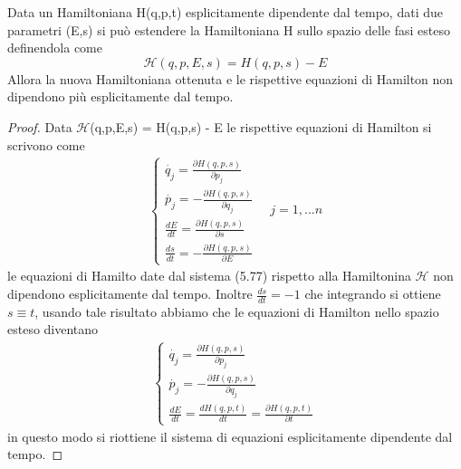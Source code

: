 \begin{theorem} Data un Hamiltoniana H(q,p,t) esplicitamente dipendente dal tempo, dati due parametri (E,s) si pu\`{o} estendere la Hamiltoniana H sullo spazio delle fasi esteso definendola come 
\begin{equation}
	\mathcal{H}(q,p,E,s) = H(q,p,s)-E
\end{equation} 
Allora la nuova Hamiltoniana ottenuta e le rispettive equazioni di Hamilton non dipendono pi\`{u} esplicitamente dal tempo.
\end{theorem}
\begin{proof}
Data $\mathcal{H}$(q,p,E,s) = H(q,p,s) - E le rispettive equazioni di Hamilton si scrivono come
\begin{align}
	\begin{cases}
		\dot{q_j} = \frac{\partial H(q,p,s)}{\partial p_j}\\
		\dot{p_j} = - \frac{\partial H(q,p,s)}{\partial q_j}\\
		\frac{dE}{dt} = \frac{\partial H(q,p,s)}{\partial s}\\
		\frac{ds}{dt} = -\frac{\partial H(q,p,s)}{\partial E}
	\end{cases} \quad j = 1,...n
\end{align}
le equazioni di Hamilto date dal sistema (5.77) rispetto alla Hamiltonina $\mathcal{H}$ non dipendono esplicitamente dal tempo. Inoltre $\frac{ds}{dt} = -1$ che integrando si ottiene $s \equiv t$, usando tale risultato abbiamo che le equazioni di Hamilton nello spazio esteso diventano
\begin{align}
	\begin{cases}
		\dot{q_j} = \frac{\partial H(q,p,s)}{\partial p_j}\\
		\dot{p_j} = - \frac{\partial H(q,p,s)}{\partial q_j}\\
		\frac{dE}{dt} = \frac{dH(q,p,t)}{dt} =  \frac{\partial H(q,p,t)}{\partial t}
	\end{cases}
\end{align}
in questo modo si riottiene il sistema di equazioni esplicitamente dipendente dal tempo.

\end{proof}

